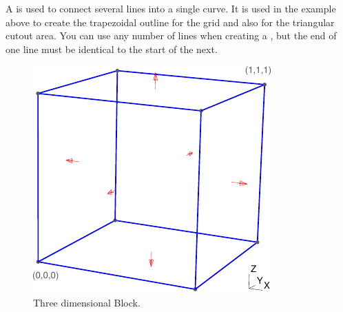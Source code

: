 A  is used to connect several lines into a single curve.
It is used in the example above to create the trapezoidal outline for the grid
and also for the triangular cutout area.
You can use any number of lines when creating a , but
the end of one line must be identical to the start of the next.


\begin{figure}
\centerline{\includegraphics[width=\figwidth]{figures/brick}}
\caption{Three dimensional Block.}
\label{fig:PYCAD 2}
\end{figure}


